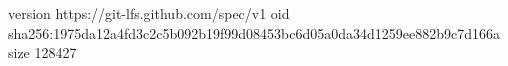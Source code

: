 version https://git-lfs.github.com/spec/v1
oid sha256:1975da12a4fd3c2c5b092b19f99d08453bc6d05a0da34d1259ee882b9c7d166a
size 128427
